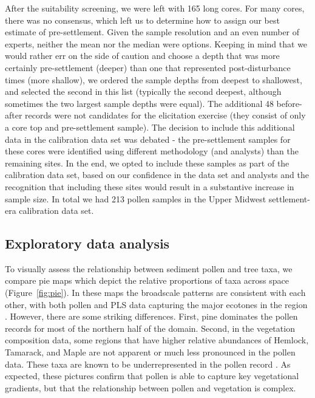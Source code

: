 \documentclass[12pt]{article}
\begin{document}
After the suitability screening, we were left with 165 long cores. For
many cores, there was no consensus, which left us to determine how to
assign our best estimate of pre-settlement. Given the sample
resolution and an even number of experts, neither the mean nor the
median were options. Keeping in mind that we would rather err on the
side of caution and choose a depth that was more certainly
pre-settlement (deeper) than one that represented post-disturbance
times (more shallow), we ordered the sample depths from deepest to
shallowest, and selected the second in this list (typically the second
deepest, although sometimes the two largest sample depths were equal).
The additional 48 before-after records were not candidates for the
elicitation exercise (they consist of only a core top and
pre-settlement sample). The decision to include this additional data
in the calibration data set was debated - the pre-settlement samples
for these cores were identified using different methodology (and
analysts) than the remaining sites. In the end, we opted to include
these samples as part of the calibration data set, based on our
confidence in the data set and analysts and the recognition that
including these sites would result in a substantive increase in sample
size. In total we had 213 pollen samples in the Upper Midwest
settlement-era calibration data set.

\subsection{Exploratory data analysis}

To visually assess the relationship between sediment pollen and tree
taxa, we compare pie maps which depict the relative proportions of
taxa across space (Figure~\ref{fig:pie}). In these maps the broadscale
patterns are consistent with each other, with both pollen and PLS data
capturing the major ecotones in the region
\citep{solomon1985computer}.  However, there are some striking
differences. First, pine dominates the pollen records for most of the
northern half of the domain. Second, in the vegetation composition
data, some regions that have higher relative abundances of Hemlock,
Tamarack, and Maple are not apparent or much less pronounced in the
pollen data. These taxa are known to be underrepresented in the pollen
record \citep{XXX}. As expected, these pictures confirm that pollen is able
to capture key vegetational gradients, but that the relationship
between pollen and vegetation is complex.
\end{document}
